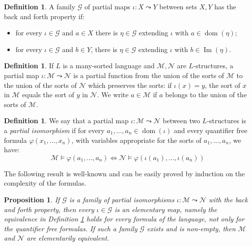 \documentclass{amsart}
\newcommand{\ca}{\mathcal}
\newcommand{\dom}{\operatorname{dom}}
\newcommand{\img}{\operatorname{Im}}
\theoremstyle{plain}
\newtheorem{prop}[thm]{Proposition}
\theoremstyle{definition}
\newtheorem{defn}[thm]{Definition}
\newcommand{\pto}{\leadsto} %
\begin{document}
\begin{defn} \label{defn:back forth}
A family $\ca G$ of partial maps $\iota : X \pto Y$ between sets $X, Y$ has the back and forth property if:
\begin{itemize}
\item for every $\iota  \in \ca G$ and $a\in X$ there is $\eta  \in \ca G$ extending $\iota$ with $a\in \dom(\eta )$;
\item for every $\iota  \in \ca G$ and $b \in Y$, there is $\eta  \in \ca G$ extending $\iota$ with $b\in \img (\eta )$. 
\end{itemize}
\end{defn}


\begin{defn}
If $L$ is a many-sorted language and $\ca M, \ca N$ are $L$-structures, 
a partial map $\iota : \ca M \pto \ca N$ is a partial function from the union of the sorts of $\ca M$ to the union of the sorts of $\ca N$ which preserves the sorts: if $\iota(x) = y$, the sort of $x$ in $\ca M$ equals the sort of $y$ in $\ca N$. We write $a \in \ca M$ if $a$ belongs to the union of the sorts of $\ca M$. 
\end{defn}

\begin{defn}\label{defn:piso}
We say that a partial map $\iota: \ca M \pto \ca N $ between two $L$-structures is a {\em partial isomorphism} if for every $a_1, \ldots, a_n \in \dom(\iota )$ and every quantifier free formula 
%
$\varphi(x_1, \ldots, x_n)$, with variables appropriate for the sorts of $a_1, \ldots, a_n$, we have: 
%
\begin{equation*}
\ca M \models \varphi(a_1, \ldots, a_n) \iff \ca N \models \varphi (\iota (a_1), \ldots, \iota (a_n))
\end{equation*}
\end{defn}

The following result is well-known and can be easily proved by induction on the complexity of the formulas. 

\begin{prop}\label{prop:back forth}
If $\ca G$ is a family of partial isomorphisms $\iota: \ca M \pto \ca N$ with the back and forth property, then every $\iota \in \ca G$ is an \emph{elementary map}, namely the equivalence in Definition \ref{defn:piso} holds for every formula of the language, not only for the quantifier free formulas. If such a family $\ca G$ exists and is non-empty, then $\ca M$ and $\ca N$ are elementarily equivalent. 
\end{prop}
\end{document}
